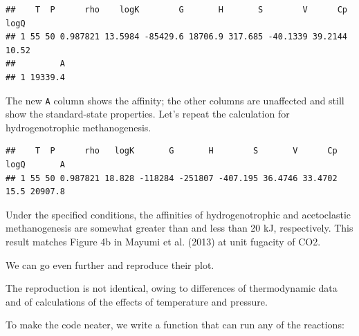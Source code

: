 \documentclass[]{tufte-handout}
\newenvironment{Shaded}{}{}
\newcommand{\KeywordTok}[1]{\textcolor[rgb]{0.00,0.44,0.13}{\textbf{#1}}}
\newcommand{\DataTypeTok}[1]{\textcolor[rgb]{0.56,0.13,0.00}{#1}}
\newcommand{\DecValTok}[1]{\textcolor[rgb]{0.25,0.63,0.44}{#1}}
\newcommand{\FloatTok}[1]{\textcolor[rgb]{0.25,0.63,0.44}{#1}}
\newcommand{\StringTok}[1]{\textcolor[rgb]{0.25,0.44,0.63}{#1}}
\newcommand{\ControlFlowTok}[1]{\textcolor[rgb]{0.00,0.44,0.13}{\textbf{#1}}}
\newcommand{\OperatorTok}[1]{\textcolor[rgb]{0.40,0.40,0.40}{#1}}
\newcommand{\NormalTok}[1]{#1}
\begin{document}
\begin{verbatim}
##    T  P      rho    logK        G       H       S        V      Cp  logQ
## 1 55 50 0.987821 13.5984 -85429.6 18706.9 317.685 -40.1339 39.2144 10.52
##         A
## 1 19339.4
\end{verbatim}

The new \texttt{A} column shows the affinity; the other columns are
unaffected and still show the standard-state properties. Let's repeat
the calculation for hydrogenotrophic methanogenesis.

\begin{Shaded}
\end{Shaded}

\begin{verbatim}
##    T  P      rho   logK       G       H        S       V      Cp logQ       A
## 1 55 50 0.987821 18.828 -118284 -251807 -407.195 36.4746 33.4702 15.5 20907.8
\end{verbatim}

Under the specified conditions, the affinities of hydrogenotrophic and
acetoclastic methanogenesis are somewhat greater than and less than 20
kJ, respectively. This result matches Figure 4b in Mayumi et al. (2013)
at unit fugacity of CO2.

We can go even further and reproduce their plot.

\begin{marginfigure}
The reproduction is not identical, owing to differences of thermodynamic
data and of calculations of the effects of temperature and pressure.
\end{marginfigure}

To make the code neater, we write a function that can run any of the
reactions:

\begin{Shaded}
\end{Shaded}
\end{document}
